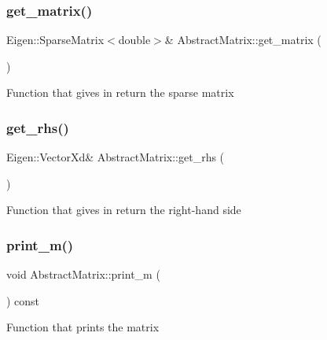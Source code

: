 \mbox{\label{classAbstractMatrix_a9fd2d0c61c8f8cd0f272a5649ca0d043}} 
\subsubsection{\texorpdfstring{get\+\_\+matrix()}{get\_matrix()}}
{\footnotesize\ttfamily Eigen\+::\+Sparse\+Matrix$<$double$>$\& Abstract\+Matrix\+::get\+\_\+matrix (\begin{DoxyParamCaption}{ }\end{DoxyParamCaption})}

Function that gives in return the sparse matrix \mbox{\label{classAbstractMatrix_aa47f7f7fee3465e4d750538f27485a7e}} 
\subsubsection{\texorpdfstring{get\+\_\+rhs()}{get\_rhs()}}
{\footnotesize\ttfamily Eigen\+::\+Vector\+Xd\& Abstract\+Matrix\+::get\+\_\+rhs (\begin{DoxyParamCaption}{ }\end{DoxyParamCaption})}

Function that gives in return the right-\/hand side \mbox{\label{classAbstractMatrix_a68df381d8ccd85e8cdd74302a4baa21b}} 
\subsubsection{\texorpdfstring{print\+\_\+m()}{print\_m()}}
{\footnotesize\ttfamily void Abstract\+Matrix\+::print\+\_\+m (\begin{DoxyParamCaption}{ }\end{DoxyParamCaption}) const}

Function that prints the matrix \mbox{\label{classAbstractMatrix_aa0a17dacbeede4180531b115d4a9f3eb}} 
